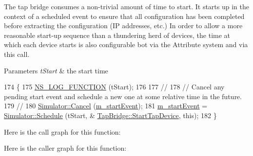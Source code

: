 The tap bridge consumes a non-\/trivial amount of time to start. It starts up in the context of a scheduled event to ensure that all configuration has been completed before extracting the configuration (IP addresses, etc.) In order to allow a more reasonable start-\/up sequence than a thundering herd of devices, the time at which each device starts is also configurable bot via the Attribute system and via this call.


\begin{DoxyParams}{Parameters}
{\em t\+Start} & the start time \\
\hline
\end{DoxyParams}

\begin{DoxyCode}
174 \{
175   \hyperlink{log-macros-disabled_8h_a90b90d5bad1f39cb1b64923ea94c0761}{NS\_LOG\_FUNCTION} (tStart);
176 
177   \textcolor{comment}{//}
178   \textcolor{comment}{// Cancel any pending start event and schedule a new one at some relative time in the future.}
179   \textcolor{comment}{//}
180   \hyperlink{classns3_1_1Simulator_a1b903a62d6117ef28f7ba3c6500689bf}{Simulator::Cancel} (\hyperlink{classns3_1_1TapBridge_ad3b52854cf5e27c04fcbf62030e725ec}{m\_startEvent});
181   \hyperlink{classns3_1_1TapBridge_ad3b52854cf5e27c04fcbf62030e725ec}{m\_startEvent} = \hyperlink{classns3_1_1Simulator_a671882c894a08af4a5e91181bf1eec13}{Simulator::Schedule} (tStart, &
      \hyperlink{classns3_1_1TapBridge_a15e7ac0069167eb1e1d63b3cefe86002}{TapBridge::StartTapDevice}, \textcolor{keyword}{this});
182 \}
\end{DoxyCode}


Here is the call graph for this function\+:




Here is the caller graph for this function\+:


